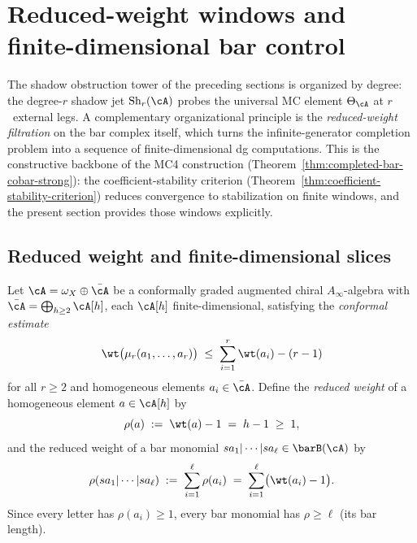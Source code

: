 
\section{Reduced-weight windows and finite-dimensional bar control}
\label{sec:nms-reduced-weight-windows}

The shadow obstruction tower of the preceding sections is organized by
degree: the degree-$r$ shadow jet $\mathrm{Sh}_r(\cA)$ probes the
universal MC element $\Theta_\cA$ at $r$~external legs. A
complementary organizational principle is the \emph{reduced-weight
filtration} on the bar complex itself, which turns the
infinite-generator completion problem into a sequence of
finite-dimensional dg computations. This is the constructive
backbone of the MC4 construction
(Theorem~\ref{thm:completed-bar-cobar-strong}): the coefficient-stability
criterion (Theorem~\ref{thm:coefficient-stability-criterion}) reduces
convergence to stabilization on finite windows, and the present section
provides those windows explicitly.

\subsection{Reduced weight and finite-dimensional slices}
\label{subsec:nms-reduced-weight-definition}

\begin{definition}
\label{def:reduced-weight}%
%
Let $\cA = \omega_X \oplus \bar{\cA}$ be a conformally graded
augmented chiral $A_\infty$-algebra with
$\bar{\cA} = \bigoplus_{h \geq 2} \cA[h]$,
each $\cA[h]$ finite-dimensional, satisfying the \emph{conformal
estimate}
\begin{equation}\label{eq:nms-conformal-estimate}
\wt\bigl(\mu_r(a_1,\ldots,a_r)\bigr)
\;\leq\;
\sum_{i=1}^r \wt(a_i) - (r-1)
\end{equation}
for all $r \geq 2$ and homogeneous elements $a_i \in \bar{\cA}$.
Define the \emph{reduced weight} of a homogeneous element
$a \in \cA[h]$ by
\[
\rho(a) \;:=\; \wt(a) - 1 \;=\; h - 1 \;\geq\; 1,
\]
and the reduced weight of a bar monomial
$sa_1 | \cdots | sa_\ell \in \barB(\cA)$ by
\begin{equation}\label{eq:nms-reduced-weight-bar}
\rho(sa_1 | \cdots | sa_\ell)
\;:=\;
\sum_{i=1}^\ell \rho(a_i)
\;=\;
\sum_{i=1}^\ell \bigl(\wt(a_i) - 1\bigr).
\end{equation}
Since every letter has $\rho(a_i) \geq 1$, every bar monomial has
$\rho \geq \ell$ (its bar length).
\end{definition}


